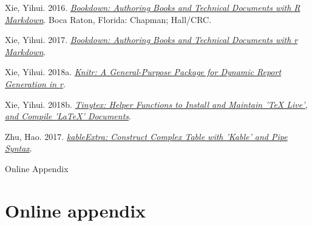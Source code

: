 \documentclass[
  12pt,
]{article}
\newlength{\cslhangindent}
\newlength{\cslentryspacingunit} %
\newenvironment{CSLReferences}[2] %
 {%
  \setlength{\parindent}{0pt}
  \ifodd #1
  \let\oldpar\par
  \def\par{\hangindent=\cslhangindent\oldpar}
  \fi
  \setlength{\parskip}{#2\cslentryspacingunit}
 }%
 {}
\begin{document}
\begin{CSLReferences}{1}{0}
\leavevmode{}%
Xie, Yihui. 2016.
\emph{\href{https://github.com/rstudio/bookdown}{Bookdown: Authoring
Books and Technical Documents with {R} Markdown}}. Boca Raton, Florida:
Chapman; Hall/CRC.

\leavevmode{}%
Xie, Yihui. 2017.
\emph{\href{https://github.com/rstudio/bookdown}{Bookdown: Authoring
Books and Technical Documents with r Markdown}}.

\leavevmode{}%
Xie, Yihui. 2018a. \emph{\href{https://yihui.name/knitr/}{Knitr: A
General-Purpose Package for Dynamic Report Generation in r}}.

\leavevmode{}%
Xie, Yihui. 2018b.
\emph{\href{https://CRAN.R-project.org/package=tinytex}{Tinytex: Helper
Functions to Install and Maintain 'TeX Live', and Compile 'LaTeX'
Documents}}.

\leavevmode{}%
Zhu, Hao. 2017.
\emph{\href{https://CRAN.R-project.org/package=kableExtra}{kableExtra:
Construct Complex Table with 'Kable' and Pipe Syntax}}.

\end{CSLReferences}

\clearpage

\appendix
{}

\renewcommand{\thesection}{A}

\setcounter{page}{1}

\setcounter{table}{0}
\renewcommand{\thetable}{A\arabic{table}}
\renewcommand{\figurename}{Table}

\setcounter{figure}{0}
\renewcommand\thefigure{A\arabic{figure}}
\renewcommand{\figurename}{Figure}

\clearpage
{}

\vspace*{7cm}

\begin{center}
\begin{huge}
Online Appendix
\end{huge}
\end{center}
\vspace{3cm}

\clearpage
{}

\hypertarget{online-appendix}{%
\section{Online appendix}\label{online-appendix}}
\end{document}
